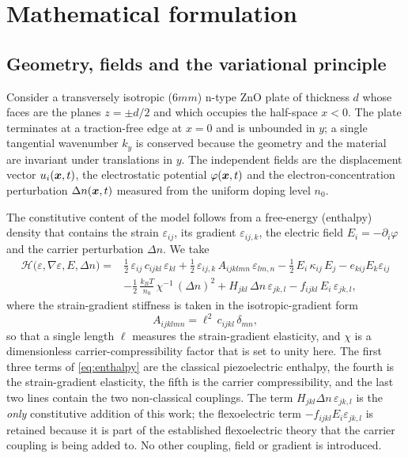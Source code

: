 \section{Mathematical formulation}
\label{sec:governing}

\subsection{Geometry, fields and the variational principle}
\label{sec:governing_variational}

Consider a transversely isotropic ($6mm$) n-type ZnO plate of thickness $d$
whose faces are the planes $z=\pm d/2$ and which occupies the half-space
$x<0$.  The plate terminates at a traction-free edge at $x=0$ and is unbounded
in $y$; a single tangential wavenumber $k_y$ is conserved because the geometry
and the material are invariant under translations in $y$.  The independent
fields are the displacement vector $u_i(\boldsymbol{x},t)$, the electrostatic
potential $\varphi(\boldsymbol{x},t)$ and the electron-concentration perturbation
$\Delta n(\boldsymbol{x},t)$ measured from the uniform doping level $n_0$.

The constitutive content of the model follows from a free-energy (enthalpy)
density that contains the strain $\varepsilon_{ij}$, its gradient
$\varepsilon_{ij,k}$, the electric field $E_i=-\partial_i\varphi$ and the carrier
perturbation $\Delta n$.  We take
\begin{equation}
\label{eq:enthalpy}
\begin{aligned}
\mathcal{H}\bigl(\varepsilon,\nabla\varepsilon,E,\Delta n\bigr)
={}&\tfrac12\,\varepsilon_{ij}\,c_{ijkl}\,\varepsilon_{kl}
+\tfrac12\,\varepsilon_{ij,k}\,A_{ijklmn}\,\varepsilon_{lm,n}
-\tfrac12\,E_i\,\kappa_{ij}\,E_j
-e_{kij}E_k\varepsilon_{ij}\\
&-\tfrac12\,\frac{k_BT}{n_0}\,\chi^{-1}\,(\Delta n)^2
+H_{jkl}\,\Delta n\,\varepsilon_{jk,l}
-f_{ijkl}\,E_i\,\varepsilon_{jk,l},
\end{aligned}
\end{equation}
where the strain-gradient stiffness is taken in the isotropic-gradient form
\begin{equation}
\label{eq:A_tensor}
A_{ijklmn}=\ell^{2}\,c_{ijkl}\,\delta_{mn},
\end{equation}
so that a single length $\ell$ measures the strain-gradient elasticity, and
$\chi$ is a dimensionless carrier-compressibility factor that is set to unity
here.  The first three terms of \eqref{eq:enthalpy} are the classical
piezoelectric enthalpy, the fourth is the strain-gradient elasticity, the fifth
is the carrier compressibility, and the last two lines contain the two
non-classical couplings.  The term $H_{jkl}\Delta n\,\varepsilon_{jk,l}$ is the
\emph{only} constitutive addition of this work; the flexoelectric term
$-f_{ijkl}E_i\varepsilon_{jk,l}$ is retained because it is part of the
established flexoelectric theory that the carrier coupling is being added to.
No other coupling, field or gradient is introduced.

